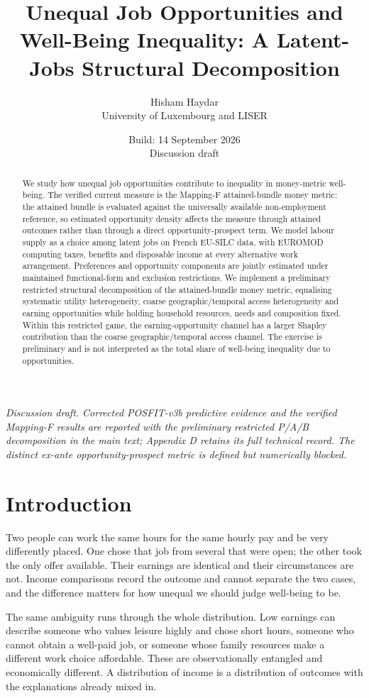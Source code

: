 \documentclass[11pt,a4paper]{article}
\title{Unequal Job Opportunities and Well-Being Inequality: A Latent-Jobs Structural Decomposition}
\author{Hisham Haydar\\University of Luxembourg and LISER}
\date{Build: 14 September 2026\\Discussion draft}
\begin{document}
\maketitle
\begin{abstract}
We study how unequal job opportunities contribute to inequality in money-metric well-being. The verified current measure is the Mapping-F attained-bundle money metric: the attained bundle is evaluated against the universally available non-employment reference, so estimated opportunity density affects the measure through attained outcomes rather than through a direct opportunity-prospect term. We model labour supply as a choice among latent jobs on French EU-SILC data, with EUROMOD computing taxes, benefits and disposable income at every alternative work arrangement. Preferences and opportunity components are jointly estimated under maintained functional-form and exclusion restrictions. We implement a preliminary restricted structural decomposition of the attained-bundle money metric, equalising systematic utility heterogeneity, coarse geographic/temporal access heterogeneity and earning opportunities while holding household resources, needs and composition fixed. Within this restricted game, the earning-opportunity channel has a larger Shapley contribution than the coarse geographic/temporal access channel. The exercise is preliminary and is not interpreted as the total share of well-being inequality due to opportunities.
\end{abstract}

\emph{Discussion draft. Corrected POSFIT-v3b predictive evidence and the verified Mapping-F results are reported with the preliminary restricted P/A/B decomposition in the main text; Appendix D retains its full technical record. The distinct ex-ante opportunity-prospect metric is defined but numerically blocked.}

\section{Introduction}\label{introduction}

Two people can work the same hours for the same hourly pay and be very differently placed. One chose that job from several that were open; the other took the only offer available. Their earnings are identical and their circumstances are not. Income comparisons record the outcome and cannot separate the two cases, and the difference matters for how unequal we should judge well-being to be.

The same ambiguity runs through the whole distribution. Low earnings can describe someone who values leisure highly and chose short hours, someone who cannot obtain a well-paid job, or someone whose family resources make a different work choice affordable. These are observationally entangled and economically different. A distribution of income is a distribution of outcomes with the explanations already mixed in.
\end{document}
